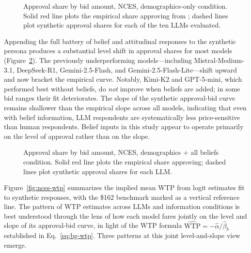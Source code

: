 \documentclass[12pt]{article}
\begin{document}
\begin{figure}[h]
    \centering
    \caption{Approval share by bid amount, NCES, demographics-only
    condition. Solid red line plots the empirical share approving from
    \textcite{Aldy2012}; dashed lines plot synthetic approval shares for
    each of the ten LLMs evaluated.}
    \label{fig:nces-demo-only}
\end{figure}

Appending the full battery of belief and attitudinal responses to the
synthetic persona produces a substantial level shift in approval shares
for most models (Figure~\ref{fig:nces-all-beliefs}). The previously
underperforming models---including Mistral-Medium-3.1, DeepSeek-R1,
Gemini-2.5-Flash, and Gemini-2.5-Flash-Lite---shift upward and now
bracket the empirical curve. Notably, Kimi-K2 and GPT-5-mini, which
performed best without beliefs, do \emph{not} improve when beliefs are
added; in some bid ranges their fit deteriorates. The slope of the
synthetic approval-bid curve remains shallower than the empirical slope
across all models, indicating that even with belief information, LLM
respondents are systematically less price-sensitive than human respondents.
Belief inputs in this study appear to operate primarily on the level of
approval rather than on the slope.

\begin{figure}[h]
    \centering
    \caption{Approval share by bid amount, NCES, demographics + all
    beliefs condition. Solid red line plots the empirical share approving;
    dashed lines plot synthetic approval shares for each LLM.}
    \label{fig:nces-all-beliefs}
\end{figure}

Figure~\ref{fig:nces-wtp} summarizes the implied mean WTP from logit
estimates fit to synthetic responses, with the \$162 benchmark marked as
a vertical reference line. The pattern of WTP estimates across LLMs and
information conditions is best understood through the lens of how each
model fares jointly on the level and slope of its approval-bid curve, in
light of the WTP formula $\widehat{\text{WTP}} = -\hat{\alpha}/\hat{\beta}_b$
established in Eq.~\ref{eq:bg-wtp}. Three patterns at this joint
level-and-slope view emerge.
\end{document}
